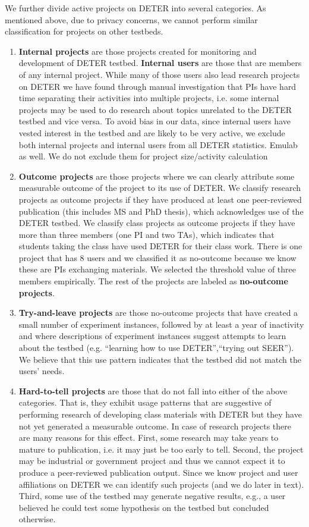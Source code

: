We further divide active projects on DETER into several categories. As
mentioned above, due to privacy concerns, we cannot perform similar
classification for projects on other testbeds. \begin{enumerate} \item
\textbf{Internal projects} are those projects created for monitoring and
development of DETER testbed. \textbf{Internal users} are those that are
members of any internal project. While many of those users also lead
research projects on DETER we have found through manual investigation
that PIs have hard time separating their activities into multiple
projects, i.e. some internal projects may be used to do research about
topics unrelated to the DETER testbed and vice versa. To avoid bias in
our data, since internal users have vested interest in the testbed and
are likely to be very active, we exclude both internal projects and
internal users from all DETER statistics. %
Emulab as well. We do not exclude them for project size/activity
calculation \item \textbf{Outcome projects} are those projects where we
can clearly attribute some measurable outcome of the project to its use
of DETER. We classify research projects as outcome projects if they have
produced at least one peer-reviewed publication (this includes MS and
PhD thesis), which acknowledges use of the DETER testbed. We classify
class projects as outcome projects if they have more than three members
(one PI and two TAs),  which indicates that students taking the class
have used DETER for their class work. There is one project that has 8
users and we classified it as no-outcome because we know these are PIs
exchanging materials. We selected the threshold value of three members
empirically. The rest of the projects are labeled as \textbf{no-outcome
projects}. \item \textbf{Try-and-leave projects} are those no-outcome
projects that have created a small number of experiment instances,
followed by at least a year of inactivity and where descriptions of
experiment instances suggest attempts to learn about the testbed (e.g.
``learning how to use DETER'',``trying out SEER''). We believe that this
use pattern indicates that the testbed did not match the users' needs.
\item \textbf{Hard-to-tell projects} are those that do not fall into
either of the above categories. That is, they exhibit usage patterns
that are suggestive of performing research of developing class materials
with DETER but they have not yet generated a measurable outcome. In case
of research projects there are many reasons for this effect. First, some
research may take years to mature to publication, i.e. it may just be
too early to tell. Second, the project may be industrial or government
project and thus we cannot expect it to produce a peer-reviewed
publication output. Since we know project and user affiliations on DETER
we can identify such projects (and we do later in text). Third, some use
of the testbed may generate negative results, e.g., a user believed he
could test some hypothesis on the testbed but concluded otherwise.
\end{enumerate}


